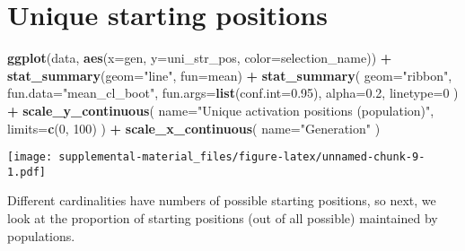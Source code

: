 \documentclass[]{book}
\newenvironment{Shaded}{\begin{snugshade}}{\end{snugshade}}
\newcommand{\DataTypeTok}[1]{\textcolor[rgb]{0.13,0.29,0.53}{#1}}
\newcommand{\DecValTok}[1]{\textcolor[rgb]{0.00,0.00,0.81}{#1}}
\newcommand{\FloatTok}[1]{\textcolor[rgb]{0.00,0.00,0.81}{#1}}
\newcommand{\KeywordTok}[1]{\textcolor[rgb]{0.13,0.29,0.53}{\textbf{#1}}}
\newcommand{\NormalTok}[1]{#1}
\newcommand{\OperatorTok}[1]{\textcolor[rgb]{0.81,0.36,0.00}{\textbf{#1}}}
\newcommand{\StringTok}[1]{\textcolor[rgb]{0.31,0.60,0.02}{#1}}
\begin{document}
\hypertarget{unique-starting-positions}{%
\section{Unique starting positions}\label{unique-starting-positions}}

\begin{Shaded}
\begin{Highlighting}[]
\KeywordTok{ggplot}\NormalTok{(data, }\KeywordTok{aes}\NormalTok{(}\DataTypeTok{x=}\NormalTok{gen, }\DataTypeTok{y=}\NormalTok{uni_str_pos, }\DataTypeTok{color=}\NormalTok{selection_name)) }\OperatorTok{+}
\StringTok{  }\KeywordTok{stat_summary}\NormalTok{(}\DataTypeTok{geom=}\StringTok{"line"}\NormalTok{, }\DataTypeTok{fun=}\NormalTok{mean) }\OperatorTok{+}
\StringTok{  }\KeywordTok{stat_summary}\NormalTok{(}
    \DataTypeTok{geom=}\StringTok{"ribbon"}\NormalTok{,}
    \DataTypeTok{fun.data=}\StringTok{"mean_cl_boot"}\NormalTok{,}
    \DataTypeTok{fun.args=}\KeywordTok{list}\NormalTok{(}\DataTypeTok{conf.int=}\FloatTok{0.95}\NormalTok{),}
    \DataTypeTok{alpha=}\FloatTok{0.2}\NormalTok{,}
    \DataTypeTok{linetype=}\DecValTok{0}
\NormalTok{  ) }\OperatorTok{+}
\StringTok{  }\KeywordTok{scale_y_continuous}\NormalTok{(}
    \DataTypeTok{name=}\StringTok{"Unique activation positions (population)"}\NormalTok{,}
    \DataTypeTok{limits=}\KeywordTok{c}\NormalTok{(}\DecValTok{0}\NormalTok{, }\DecValTok{100}\NormalTok{)}
\NormalTok{  ) }\OperatorTok{+}
\StringTok{  }\KeywordTok{scale_x_continuous}\NormalTok{(}
    \DataTypeTok{name=}\StringTok{"Generation"}
\NormalTok{  )}
\end{Highlighting}
\end{Shaded}

\texttt{[image: supplemental-material\_files/figure-latex/unnamed-chunk-9-1.pdf]}

Different cardinalities have numbers of possible starting positions, so next, we look at the proportion of starting positions (out of all possible) maintained by populations.
\end{document}
